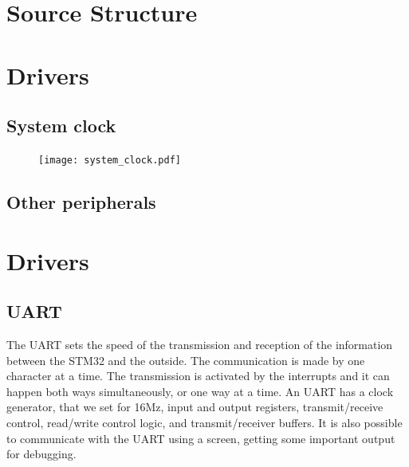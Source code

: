 \section{Source Structure}


\section{Drivers}

\subsection{System clock}
\begin{figure}[H]
\centering
\texttt{[image: system\_clock.pdf]}
\label{fig:advanced_system}
\end{figure}


\subsection{Other peripherals}

\section{Drivers}


\subsection{UART}
The UART sets the speed of the transmission and reception of the information between the STM32 and the outside. The communication is made by one character at a time. The transmission is activated by the interrupts and it can happen both ways simultaneously, or one way at a time. An UART has a clock generator, that we set for 16Mz, input and output registers, transmit/receive control, read/write control logic, and transmit/receiver buffers.
It is also possible to communicate with the UART using a screen, getting some important output for debugging.

